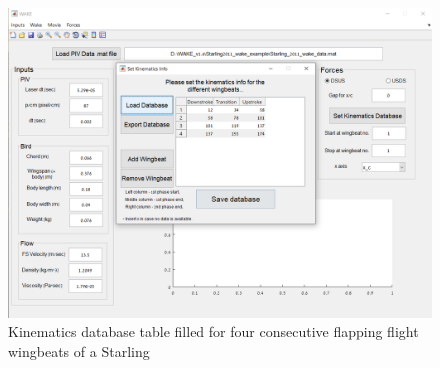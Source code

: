 \documentclass[12pt,a4paper]{article}
\begin{document}
\begin{figure}[ht!]
	\centering
	\includegraphics[width=\textwidth]{Kinematics-db-filled}
	\caption{Kinematics database table filled for four consecutive flapping flight wingbeats of a Starling}
	\label{fig:GUI-Kinematics-db-filled}
\end{figure}



\newpage
\end{document}
